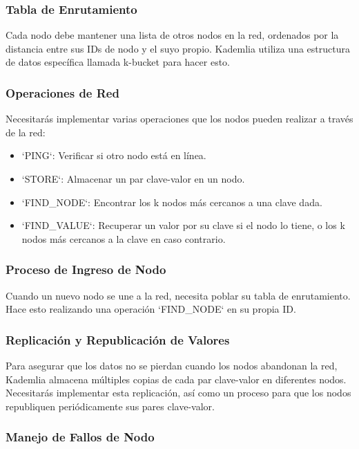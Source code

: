 \documentclass[10pt]{article} %
\begin{document}
	\subsubsection{Tabla de Enrutamiento}
	
	 Cada nodo debe mantener una lista de otros nodos en la red, ordenados por la distancia entre sus IDs de nodo y el suyo propio. Kademlia utiliza una estructura de datos específica llamada k-bucket para hacer esto.
	
	\subsubsection{Operaciones de Red} 
	
	Necesitarás implementar varias operaciones que los nodos pueden realizar a través de la red:
	
	\begin{itemize}
		\item  `PING`: Verificar si otro nodo está en línea.
		\item  `STORE`: Almacenar un par clave-valor en un nodo.
		\item  `FIND\_NODE`: Encontrar los k nodos más cercanos a una clave dada.
		\item  `FIND\_VALUE`: Recuperar un valor por su clave si el nodo lo tiene, o los k nodos más cercanos a la clave en caso contrario.
	\end{itemize}
	
	\subsubsection{Proceso de Ingreso de Nodo} 
	
	Cuando un nuevo nodo se une a la red, necesita poblar su tabla de enrutamiento. Hace esto realizando una operación `FIND\_NODE` en su propia ID.
	
	\subsubsection{Replicación y Republicación de Valores} 
	
	Para asegurar que los datos no se pierdan cuando los nodos abandonan la red, Kademlia almacena múltiples copias de cada par clave-valor en diferentes nodos. Necesitarás implementar esta replicación, así como un proceso para que los nodos republiquen periódicamente sus pares clave-valor.
	
	\subsubsection{Manejo de Fallos de Nodo} 
	
\end{document}
